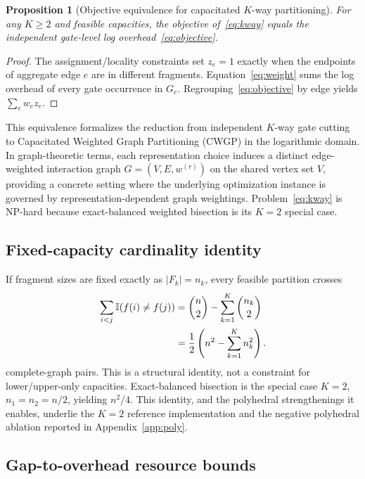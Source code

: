 \documentclass[
  aps,
  pra,
  reprint,
  amsmath,
  amssymb,
  longbibliography,
  nofootinbib,
  floatfix
]{revtex4-2}
\theoremstyle{plain}
\newtheorem{proposition}{Proposition}
\begin{document}
\begin{proposition}[Objective equivalence for capacitated $K$-way partitioning]\label{prop:kway-equiv}
For any $K\geq2$ and feasible capacities, the objective of~\eqref{eq:kway} equals the independent gate-level log overhead~\eqref{eq:objective}.
\end{proposition}
\begin{proof}
The assignment/locality constraints set $z_e=1$ exactly when the endpoints of aggregate edge $e$ are in different fragments. Equation~\eqref{eq:weight} sums the log overhead of every gate occurrence in $G_e$. Regrouping~\eqref{eq:objective} by edge yields $\sum_e w_ez_e$.
\end{proof}

This equivalence formalizes the reduction from independent $K$-way gate cutting to Capacitated Weighted Graph Partitioning (CWGP) in the logarithmic domain. In graph-theoretic terms, each representation choice induces a distinct edge-weighted interaction graph $G=(V, E, w^{(r)})$ on the shared vertex set $V$, providing a concrete setting where the underlying optimization instance is governed by representation-dependent graph weightings. Problem~\eqref{eq:kway} is NP-hard because exact-balanced weighted bisection is its $K=2$ special case.

\subsection{Fixed-capacity cardinality identity}

If fragment sizes are fixed exactly as $|F_k|=n_k$, every feasible partition crosses
\begin{align}
  \sum_{i<j}\mathbb{I}(f(i)\neq f(j))
  &= \binom{n}{2}-\sum_{k=1}^{K}\binom{n_k}{2} \notag\\
  &= \frac12\left(n^2-\sum_{k=1}^{K}n_k^2\right).
  \label{eq:kway-cardinality}
\end{align}
complete-graph pairs. This is a structural identity, not a constraint for lower/upper-only capacities. Exact-balanced bisection is the special case $K=2$, $n_1=n_2=n/2$, yielding $n^2/4$. This identity, and the polyhedral strengthenings it enables, underlie the $K=2$ reference implementation and the negative polyhedral ablation reported in Appendix~\ref{app:poly}.

\subsection{Gap-to-overhead resource bounds}
\end{document}
